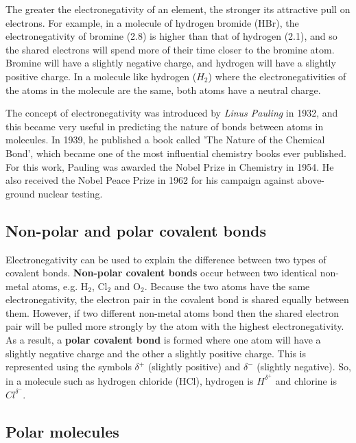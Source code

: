 The greater the electronegativity of an element, the stronger its attractive pull on electrons. For example, in a molecule of hydrogen bromide (HBr), the electronegativity of bromine (2.8) is higher than that of hydrogen (2.1), and so the shared electrons will spend more of their time closer to the bromine atom. Bromine will have a slightly negative charge, and hydrogen will have a slightly positive charge. In a molecule like hydrogen ($H_{2}$) where the electronegativities of the atoms in the molecule are the same, both atoms have a neutral charge. \\

\begin{IFact}{
The concept of electronegativity was introduced by \textit{Linus Pauling} in 1932, and this became very useful in predicting the nature of bonds between atoms in molecules. In 1939, he published a book called 'The Nature of the Chemical Bond', which became one of the most influential chemistry books ever published. For this work, Pauling was awarded the Nobel Prize in Chemistry in 1954. He also received the Nobel Peace Prize in 1962 for his campaign against above-ground nuclear testing.
}
\end{IFact}

\subsection{Non-polar and polar covalent bonds}

Electronegativity can be used to explain the difference between two
types of covalent bonds. \textbf{Non-polar covalent bonds} occur between two
identical non-metal atoms, e.g. H$_2$, Cl$_2$ and O$_2$. Because the two atoms
have the same electronegativity, the electron pair in the covalent
bond is shared equally between them. However, if two different
non-metal atoms bond then the shared electron pair will be pulled more
strongly by the atom with the highest electronegativity. As a result, a \textbf{polar covalent bond} is formed where one atom will have a slightly negative charge and the other a slightly
positive charge. This is represented using the symbols $\delta^{+}$ (slightly positive) and $\delta^{-}$ (slightly negative). So, in a molecule such as hydrogen chloride (HCl), hydrogen is $H^{\delta^{+}}$ and chlorine is $Cl^{\delta^{-}}$.

\subsection{Polar molecules}

